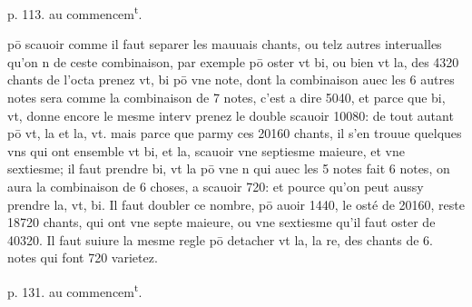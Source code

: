 \documentclass[11pt,a4paper]{article}
\begin{document}

p. 113. au commencem\textsuperscript{t}.

pō scauoir comme il faut separer les mauuais chants, ou telz autres interualles qu'on n\ill{} de ceste combinaison, par exemple pō oster vt bi, ou bien vt la, des 4320 chants de l'octa prenez vt, bi pō vne note, dont la combinaison auec les 6 autres notes sera comme la combinaison de 7 notes, c'est a dire 5040, et parce que bi, vt, donne encore le mesme interv prenez le double scauoir 10080: de tout autant pō vt, la et la, vt. mais parce que parmy ces 20160 chants, il s'en trouue quelques vns qui ont ensemble vt bi, et la, \ill{} scauoir vne septiesme maieure, et vne sextiesme; il faut prendre bi, vt la pō vne n qui auec les 5 notes fait 6 notes, on aura la combinaison de 6 choses, a scauoir 720: et pource qu'on peut aussy prendre la, vt, bi. Il faut doubler ce nombre, pō auoir 1440, le osté de 20160, reste 18720 chants, qui ont vne septe maieure, ou vne sextiesme qu'il faut oster de 40320. Il faut suiure la mesme regle pō detacher vt la, \ill{} la re, des chants de 6. notes qui font 720 varietez.

p. 131. au commencem\textsuperscript{t}.
\end{document}
